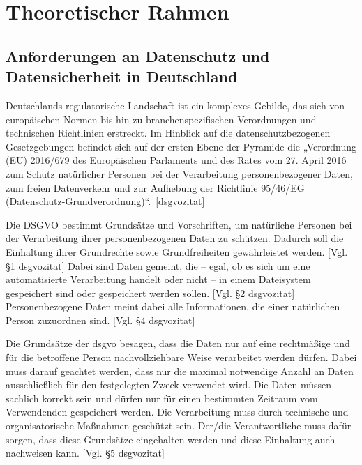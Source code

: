


\chapter{Theoretischer Rahmen}\label{cha:Theoretischer_Rahmen}

\section{Anforderungen an Datenschutz und Datensicherheit in Deutschland}\label{sec:Anforderunge}

Deutschlands regulatorische Landschaft ist ein komplexes Gebilde, das sich von europäischen Normen bis hin zu branchenspezifischen Verordnungen und technischen Richtlinien erstreckt. Im Hinblick auf die datenschutzbezogenen Gesetzgebungen befindet sich auf der ersten Ebene der Pyramide die „Verordnung (EU) 2016/679 des Europäischen Parlaments und des Rates vom 27. April 2016 zum Schutz natürlicher Personen bei der Verarbeitung personenbezogener Daten, zum freien Datenverkehr und zur Aufhebung der Richtlinie 95/46/EG (Datenschutz-Grundverordnung)“.~[\gls{dsgvozitat}]

Die DSGVO bestimmt Grundsätze und Vorschriften, um natürliche Personen bei der Verarbeitung ihrer personenbezogenen Daten zu schützen. Dadurch soll die Einhaltung ihrer Grundrechte sowie Grundfreiheiten gewährleistet werden. [Vgl. §1 \gls{dsgvozitat}] Dabei sind Daten gemeint, die – egal, ob es sich um eine automatisierte Verarbeitung handelt oder nicht – in einem Dateisystem gespeichert sind oder gespeichert werden sollen. [Vgl. §2 \gls{dsgvozitat}] 
Personenbezogene Daten meint dabei alle Informationen, die einer natürlichen Person zuzuordnen sind. [Vgl. §4 \gls{dsgvozitat}]

Die Grundsätze der \gls{dsgvo} besagen, dass die Daten nur auf eine rechtmäßige und für die betroffene Person nachvollziehbare Weise verarbeitet werden dürfen. Dabei muss darauf geachtet werden, dass nur die maximal notwendige Anzahl an Daten ausschließlich für den festgelegten Zweck verwendet wird. Die Daten müssen sachlich korrekt sein und dürfen nur für einen bestimmten Zeitraum vom Verwendenden gespeichert werden. Die Verarbeitung muss durch technische und organisatorische Maßnahmen geschützt sein. Der/die Verantwortliche muss dafür sorgen, dass diese Grundsätze eingehalten werden und diese Einhaltung auch nachweisen kann. [Vgl. §5 \gls{dsgvozitat}]

